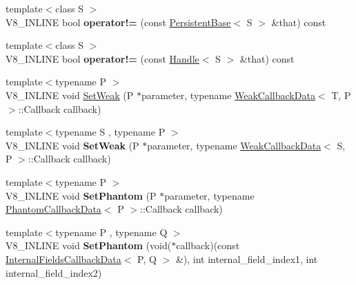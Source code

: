 \begin{DoxyCompactItemize}
\item 
\hypertarget{classv8_1_1_persistent_base_a5bfacec9ab828f9aa7abdb980481589a}{}{\footnotesize template$<$class S $>$ }\\V8\+\_\+\+I\+N\+L\+I\+N\+E bool {\bfseries operator!=} (const \hyperlink{classv8_1_1_persistent_base}{Persistent\+Base}$<$ S $>$ \&that) const \label{classv8_1_1_persistent_base_a5bfacec9ab828f9aa7abdb980481589a}

\item 
\hypertarget{classv8_1_1_persistent_base_acc30195c1ee4e1f801cab267e6855fd3}{}{\footnotesize template$<$class S $>$ }\\V8\+\_\+\+I\+N\+L\+I\+N\+E bool {\bfseries operator!=} (const \hyperlink{classv8_1_1_handle}{Handle}$<$ S $>$ \&that) const \label{classv8_1_1_persistent_base_acc30195c1ee4e1f801cab267e6855fd3}

\item 
{\footnotesize template$<$typename P $>$ }\\V8\+\_\+\+I\+N\+L\+I\+N\+E void \hyperlink{classv8_1_1_persistent_base_a1fb3293eff7a66068de13d152f73f308}{Set\+Weak} (P $\ast$parameter, typename \hyperlink{classv8_1_1_weak_callback_data}{Weak\+Callback\+Data}$<$ T, P $>$\+::Callback callback)
\item 
\hypertarget{classv8_1_1_persistent_base_a297e0c410e9496318187853e07bf8406}{}{\footnotesize template$<$typename S , typename P $>$ }\\V8\+\_\+\+I\+N\+L\+I\+N\+E void {\bfseries Set\+Weak} (P $\ast$parameter, typename \hyperlink{classv8_1_1_weak_callback_data}{Weak\+Callback\+Data}$<$ S, P $>$\+::Callback callback)\label{classv8_1_1_persistent_base_a297e0c410e9496318187853e07bf8406}

\item 
\hypertarget{classv8_1_1_persistent_base_aa67231ae9d14ed542e720b42580939ec}{}{\footnotesize template$<$typename P $>$ }\\V8\+\_\+\+I\+N\+L\+I\+N\+E void {\bfseries Set\+Phantom} (P $\ast$parameter, typename \hyperlink{classv8_1_1_phantom_callback_data}{Phantom\+Callback\+Data}$<$ P $>$\+::Callback callback)\label{classv8_1_1_persistent_base_aa67231ae9d14ed542e720b42580939ec}

\item 
\hypertarget{classv8_1_1_persistent_base_a20fcc9eee5afc961e3edbc10610fdeab}{}{\footnotesize template$<$typename P , typename Q $>$ }\\V8\+\_\+\+I\+N\+L\+I\+N\+E void {\bfseries Set\+Phantom} (void($\ast$callback)(const \hyperlink{classv8_1_1_internal_fields_callback_data}{Internal\+Fields\+Callback\+Data}$<$ P, Q $>$ \&), int internal\+\_\+field\+\_\+index1, int internal\+\_\+field\+\_\+index2)\label{classv8_1_1_persistent_base_a20fcc9eee5afc961e3edbc10610fdeab}


\end{DoxyCompactItemize}
